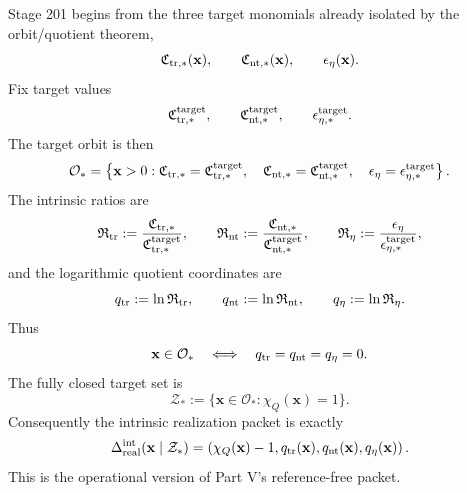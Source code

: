 Stage 201 begins from the three target monomials already isolated by the orbit/quotient theorem,
\begin{equation}
\label{eq:part06-target-monomials}
\mathfrak C_{{\rm tr},*}(\mathbf x),
\qquad
\mathfrak C_{{\rm nt},*}(\mathbf x),
\qquad
\epsilon_\eta(\mathbf x).
\end{equation}
Fix target values
\begin{equation}
\label{eq:part06-target-values}
\mathfrak C_{{\rm tr},*}^{\rm target},
\qquad
\mathfrak C_{{\rm nt},*}^{\rm target},
\qquad
\epsilon_{\eta,*}^{\rm target}.
\end{equation}
The target orbit is then
\begin{equation}
\label{eq:part06-target-orbit-def}
\mathcal O_*
=
\left\{
\mathbf x>0:
\mathfrak C_{{\rm tr},*}=\mathfrak C_{{\rm tr},*}^{\rm target},
\quad
\mathfrak C_{{\rm nt},*}=\mathfrak C_{{\rm nt},*}^{\rm target},
\quad
\epsilon_\eta=\epsilon_{\eta,*}^{\rm target}
\right\}.
\end{equation}
The intrinsic ratios are
\begin{equation}
\label{eq:part06-intrinsic-ratios}
\mathfrak R_{\rm tr}:=\frac{\mathfrak C_{{\rm tr},*}}{\mathfrak C_{{\rm tr},*}^{\rm target}},
\qquad
\mathfrak R_{\rm nt}:=\frac{\mathfrak C_{{\rm nt},*}}{\mathfrak C_{{\rm nt},*}^{\rm target}},
\qquad
\mathfrak R_\eta:=\frac{\epsilon_\eta}{\epsilon_{\eta,*}^{\rm target}},
\end{equation}
and the logarithmic quotient coordinates are
\begin{equation}
\label{eq:part06-q-defs}
q_{\rm tr}:=\ln\mathfrak R_{\rm tr},
\qquad
q_{\rm nt}:=\ln\mathfrak R_{\rm nt},
\qquad
q_\eta:=\ln\mathfrak R_\eta.
\end{equation}
Thus
\begin{equation}
\label{eq:part06-target-orbit-iff}
\mathbf x\in\mathcal O_*
\quad\Longleftrightarrow\quad
q_{\rm tr}=q_{\rm nt}=q_\eta=0.
\end{equation}
The fully closed target set is
\begin{equation}
\label{eq:part06-Zstar-def}
\mathcal Z_*:=\{\mathbf x\in\mathcal O_*:\chi_Q(\mathbf x)=1\}.
\end{equation}
Consequently the intrinsic realization packet is exactly
\begin{equation}
\label{eq:part06-intrinsic-realization-packet}
\Delta_{\rm real}^{\rm int}(\mathbf x\mid\mathcal Z_*)
=
\left(
\chi_Q(\mathbf x)-1,
q_{\rm tr}(\mathbf x),
q_{\rm nt}(\mathbf x),
q_\eta(\mathbf x)
\right).
\end{equation}
This is the operational version of Part V's reference-free packet.

